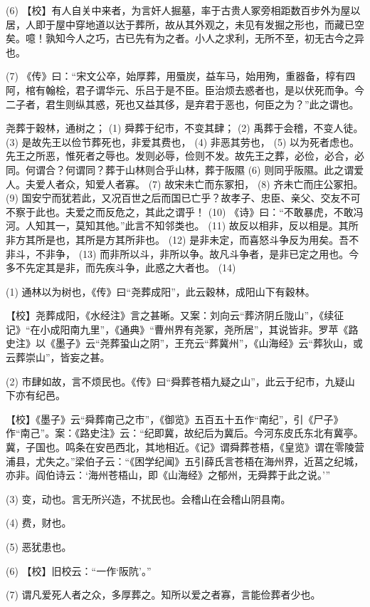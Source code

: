 \documentclass[12pt,UTF8]{ctexbook}
\begin{document}
(6) 【校】有人自关中来者，为言奸人掘墓，率于古贵人冢旁相距数百步外为屋以居，人即于屋中穿地道以达于葬所，故从其外观之，未见有发掘之形也，而藏已空矣。噫！孰知今人之巧，古已先有为之者。小人之求利，无所不至，初无古今之异也。

(7) 《传》曰：“宋文公卒，始厚葬，用蜃炭，益车马，始用殉，重器备，椁有四阿，棺有翰桧，君子谓华元、乐吕于是不臣。臣治烦去惑者也，是以伏死而争。今二子者，君生则纵其惑，死也又益其侈，是弃君于恶也，何臣之为？”此之谓也。

尧葬于穀林，通树之； (1) 舜葬于纪市，不变其肆； (2) 禹葬于会稽，不变人徒。 (3) 是故先王以俭节葬死也，非爱其费也， (4) 非恶其劳也， (5) 以为死者虑也。先王之所恶，惟死者之辱也。发则必辱，俭则不发。故先王之葬，必俭，必合，必同。何谓合？何谓同？葬于山林则合乎山林，葬于阪隰 (6) 则同乎阪隰。此之谓爱人。夫爱人者众，知爱人者寡。 (7) 故宋未亡而东冢抇， (8) 齐未亡而庄公冢抇。 (9) 国安宁而犹若此，又况百世之后而国已亡乎？故孝子、忠臣、亲父、交友不可不察于此也。夫爱之而反危之，其此之谓乎！ (10) 《诗》曰：“不敢暴虎，不敢冯河。人知其一，莫知其他。”此言不知邻类也。 (11) 故反以相非，反以相是。其所非方其所是也，其所是方其所非也。 (12) 是非未定，而喜怒斗争反为用矣。吾不非斗，不非争， (13) 而非所以斗，非所以争。故凡斗争者，是非已定之用也。今多不先定其是非，而先疾斗争，此惑之大者也。 (14)

(1) 通林以为树也，《传》曰“尧葬成阳”，此云穀林，成阳山下有穀林。

【校】尧葬成阳，《水经注》言之甚晰。又案：刘向云“葬济阴丘陇山”，《续征记》“在小成阳南九里”，《通典》“曹州界有尧冢，尧所居”，其说皆非。罗苹《路史注》以《墨子》云“尧葬蛩山之阴”，王充云“葬冀州”，《山海经》云“葬狄山，或云葬崇山”，皆妄之甚。

(2) 市肆如故，言不烦民也。《传》曰“舜葬苍梧九疑之山”，此云于纪市，九疑山下亦有纪邑。

【校】《墨子》云“舜葬南己之市”，《御览》五百五十五作“南纪”，引《尸子》作“南己”。案：《路史注》云：“纪即冀，故纪后为冀后。今河东皮氏东北有冀亭。冀，子国也。鸣条在安邑西北，其地相近。《记》谓舜葬苍梧，《皇览》谓在零陵营浦县，尤失之。”梁伯子云：“《困学纪闻》五引薛氏言苍梧在海州界，近莒之纪城，亦非。阎伯诗云：‘海州苍梧山，即《山海经》之郁州，无舜葬于此之说。’”

(3) 变，动也。言无所兴造，不扰民也。会稽山在会稽山阴县南。

(4) 费，财也。

(5) 恶犹患也。

(6) 【校】旧校云：“一作‘阪阬’。”

(7) 谓凡爱死人者之众，多厚葬之。知所以爱之者寡，言能俭葬者少也。
\end{document}
